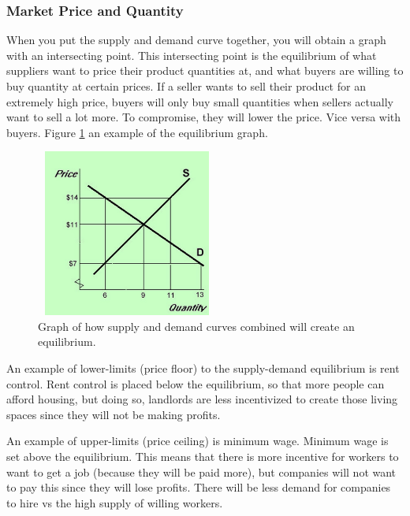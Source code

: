 \documentclass[a4paper, 12pt] {article}
\begin{document}
\subsubsection{Market Price and Quantity}
When you put the supply and demand curve together, you will obtain a graph with
an intersecting point. This intersecting point is the equilibrium of what
suppliers want to price their product quantities at, and what buyers are willing
to buy quantity at certain prices. If a seller wants to sell their product 
for an extremely high price, buyers will only buy small quantities when sellers
actually want to sell a lot more. To compromise, they will lower the price. Vice
versa with buyers. Figure \ref{fig:equilibrium} an example of the equilibrium graph.
\begin{figure}
    \centering
    \includegraphics[height=5.5cm, width=6.0cm]{equilibrium.jpg}
    \caption{Graph of how supply and demand curves combined will create an 
    equilibrium.}
    \label{fig:equilibrium}
\end{figure}

An example of lower-limits (price floor) to the supply-demand equilibrium is
rent control. Rent control is placed below the equilibrium, so that more people
can afford housing, but doing so, landlords are less incentivized to create
those living spaces since they will not be making profits.

An example of upper-limits (price ceiling) is minimum wage. Minimum wage is set
above the equilibrium. This means that there is more incentive for workers to
want to get a job (because they will be paid more), but companies will not want
to pay this since they will lose profits. There will be less demand for
companies to hire vs the high supply of willing workers.
\end{document}
